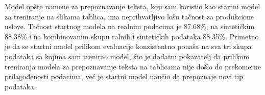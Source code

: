 \documentclass[a4paper,12pt]{article}
\begin{document}
	Model opšte namene za prepoznavanje teksta, koji sam koristio kao startni model za treniranje na slikama tablica, ima neprihvatljivo lošu tačnost za produkcione uslove. Tačnost startnog modela na realnim podacima je 87.68\%, na sintetičkim 88.38\% i na kombinovanim skupu ralnih i sintetičkih podataka 88.35\%. Primetno je da se startni model prilikom evaluacije konzistentno ponaša na sva tri skupa podataka sa kojima sam trenirao model, što je dodatni pokazatelj da prilikom treniranja modela za prepoznavanje teksta na tablicama nije došlo do prekomerne prilagođenosti podacima, već je startni model naučio da prepoznaje novi tip podataka.
	\newpage
	
	\printbibliography
\end{document}
